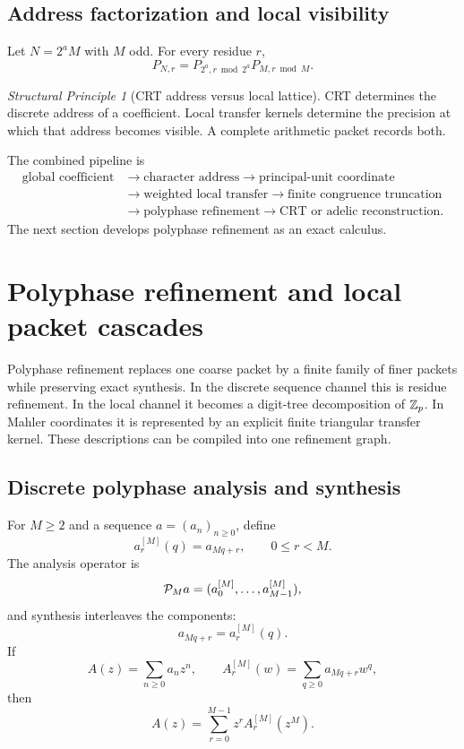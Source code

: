 \documentclass[11pt]{article}
\theoremstyle{definition}\newtheorem{definition}[theorem]{Definition}\newtheorem{example}[theorem]{Example}\newtheorem{construction}[theorem]{Construction}\newtheorem{algorithm}[theorem]{Algorithm}\newtheorem{conjecture}[theorem]{Conjecture}\newtheorem{problem}[theorem]{Problem}
\theoremstyle{remark}\newtheorem{remark}[theorem]{Remark}\newtheorem{boundary}[theorem]{Boundary}\newtheorem{certificate}[theorem]{Computational Certificate}\newtheorem{classical}[theorem]{Classical Input}\newtheorem{principle}[theorem]{Structural Principle}
\begin{document}
\subsection{Address factorization and local visibility}
Let $N=2^aM$ with $M$ odd. For every residue $r$,
\[
 \boxed{P_{N,r}=P_{2^a,r\bmod2^a}P_{M,r\bmod M}.}
\]

\begin{principle}[CRT address versus local lattice]
CRT determines the discrete address of a coefficient. Local transfer kernels determine the precision at which that address becomes visible. A complete arithmetic packet records both.
\end{principle}

The combined pipeline is
\[
 \boxed{\begin{aligned}
 \text{global coefficient}&\longrightarrow\text{character address}\longrightarrow\text{principal-unit coordinate}\\
 &\longrightarrow\text{weighted local transfer}\longrightarrow\text{finite congruence truncation}\\
 &\longrightarrow\text{polyphase refinement}\longrightarrow\text{CRT or adelic reconstruction}.
 \end{aligned}}
\]
The next section develops polyphase refinement as an exact calculus.


\section{Polyphase refinement and local packet cascades}

Polyphase refinement replaces one coarse packet by a finite family of finer packets while preserving exact synthesis. In the discrete sequence channel this is residue refinement. In the local channel it becomes a digit-tree decomposition of $\mathbb Z_p$. In Mahler coordinates it is represented by an explicit finite triangular transfer kernel. These descriptions can be compiled into one refinement graph.

\subsection{Discrete polyphase analysis and synthesis}
For $M\geq2$ and a sequence $a=(a_n)_{n\geq0}$, define
\[
 \boxed{a_r^{[M]}(q)=a_{Mq+r},\qquad0\leq r<M.}
\]
The analysis operator is
\[
 \mathcal P_Ma=(a_0^{[M]},\ldots,a_{M-1}^{[M]}),
\]
and synthesis interleaves the components:
\[
 \boxed{a_{Mq+r}=a_r^{[M]}(q).}
\]
If
\[
 A(z)=\sum_{n\geq0}a_nz^n,
 \qquad A_r^{[M]}(w)=\sum_{q\geq0}a_{Mq+r}w^q,
\]
then
\[
 \boxed{A(z)=\sum_{r=0}^{M-1}z^rA_r^{[M]}(z^M).}
\]
\end{document}
